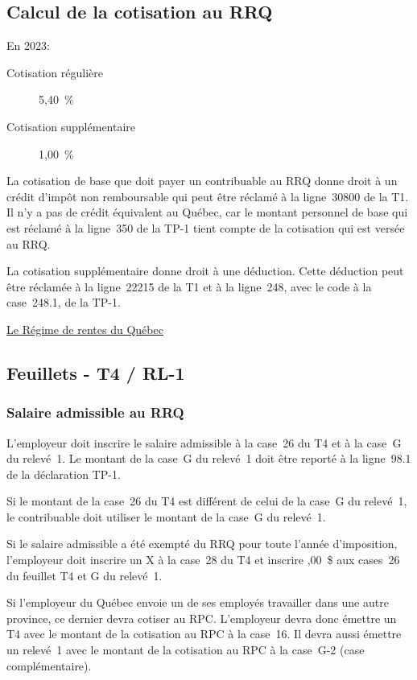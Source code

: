 \subsection{Calcul de la cotisation au RRQ}
En 2023:
\begin{description}
	\item[Cotisation régulière] 5,40~\%
	\item[Cotisation supplémentaire] 1,00~\%
\end{description}

La cotisation de base que doit payer un contribuable au RRQ donne droit à un crédit d'impôt non remboursable qui peut être réclamé à la ligne~30800 de la T1. Il n'y a pas de crédit équivalent au Québec, car le montant personnel de base qui est réclamé à la ligne~350 de la TP-1 tient compte de la cotisation qui est versée au RRQ.

La cotisation supplémentaire donne droit à une déduction. Cette déduction peut être réclamée à la ligne~22215 de la T1 et à la ligne~248, avec le code  \fg{} à la case~248.1, de la TP-1.

\qct\href{https://www.rrq.gouv.qc.ca/fr/programmes/regime_rentes/Pages/regime_rentes.aspx}{Le Régime de rentes du Québec}


\subsection{Feuillets - T4 / RL-1}
\subsubsection{Salaire admissible au RRQ}
L'employeur doit inscrire le salaire admissible à la case~26 du T4 et à la case~G  du relevé~1. Le montant de la case~G du relevé~1 doit être reporté à la ligne~98.1 de la déclaration TP-1.

Si le montant de la case~26 du T4 est différent de celui de la case~G du relevé~1, le contribuable doit utiliser le montant de la case~G du relevé~1.

Si le salaire admissible a été exempté du RRQ pour toute l'année d'imposition, l'employeur doit inscrire un \og X \fg{} à la case~28 du T4 et inscrire ,00~\$ \fg{} aux cases~26 du feuillet T4 et G du relevé~1.

\begin{note}
	Si l'employeur du Québec envoie un de ses employés travailler dans une autre province, ce dernier devra cotiser au RPC. L'employeur devra donc émettre un T4 avec le montant de la cotisation au RPC à la case~16. Il devra aussi émettre un relevé~1 avec le montant de la cotisation au RPC à la case~G-2 (case complémentaire).
\end{note}

